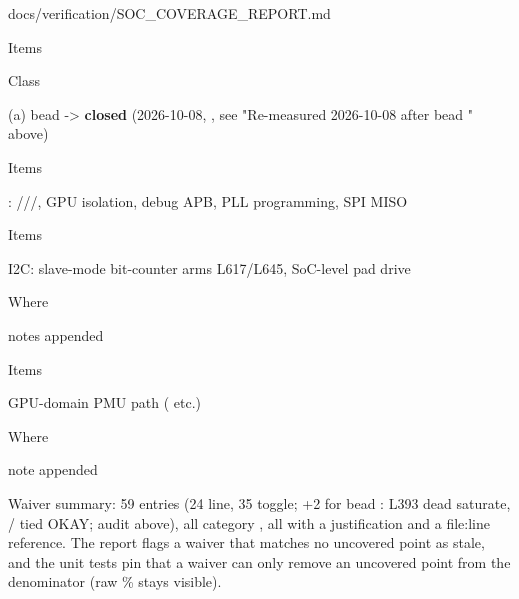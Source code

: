 \begin{relocated}{docs/verification/SOC_COVERAGE_REPORT.md}
\begin{rowtable}
\begin{rowcell}{Items}
\end{rowcell}


\begin{rowcell}{Class}

(a) bead  -\textgreater{} \textbf{closed} (2026-10-08, , see "Re-measured 2026-10-08 after bead " above)

\end{rowcell}

\begin{rowcell}{Items}

:
///, GPU
isolation, debug APB, PLL programming, SPI MISO

\end{rowcell}


\begin{rowcell}{Items}

I2C: slave-mode bit-counter arms L617/\allowbreak{}L645, SoC-level pad
drive

\end{rowcell}

\begin{rowcell}{Where}

notes appended

\end{rowcell}


\begin{rowcell}{Items}

GPU-domain PMU path ( etc.)

\end{rowcell}

\begin{rowcell}{Where}

note appended

\end{rowcell}

\end{rowtable}

Waiver summary: 59 entries (24 line, 35 toggle; +2 for bead :
 L393 dead saturate,
/ tied OKAY;  audit
above), all category , all with a justification and a file:line
reference. The report flags a waiver that matches no uncovered point as
stale, and the unit tests pin that a waiver can only remove an uncovered
point from the denominator (raw \% stays visible).


\end{relocated}

